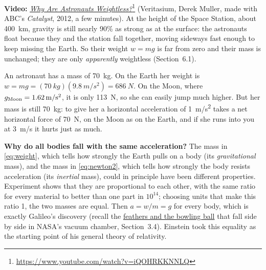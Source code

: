 \documentclass[11pt,a4paper]{article}
\begin{document}
\begin{aside}
\textbf{Video:}
\href{https://www.youtube.com/watch?v=iQOHRKKNNLQ}{\emph{Why Are Astronauts
Weightless?}}\footnote{\url{https://www.youtube.com/watch?v=iQOHRKKNNLQ}} (Veritasium, Derek
Muller, made with ABC's \emph{Catalyst}, 2012, a few minutes). At the height of the Space Station,
about \qty{400}{km}, gravity is still nearly 90\% as strong as at the surface: the astronauts float
because they and the station fall together, moving sideways fast enough to keep missing the Earth.
So their weight $w = mg$ is far from zero and their mass is unchanged; they are only
\emph{apparently} weightless (Section~6.1).
\end{aside}

\begin{example}
An astronaut has a mass of \qty{70}{kg}. On the Earth her weight is $w = mg =
(\qty{70}{kg})(\qty{9.8}{m/s^2}) = \qty{686}{N}$. On the Moon, where $g_{\mathrm{Moon}} =
\qty{1.62}{m/s^2}$, it is only \qty{113}{N}, so she can easily jump much higher. But her mass is
still \qty{70}{kg}: to give her a horizontal acceleration of \qty{1}{m/s^2} takes a net horizontal
force of \qty{70}{N}, on the Moon as on the Earth, and if she runs into you at \qty{3}{m/s} it hurts
just as much.
\end{example}

\begin{aside}
\textbf{Why do all bodies fall with the same acceleration?} The mass in \eqref{eq:weight}, which
tells how strongly the Earth pulls on a body (its \emph{gravitational} mass), and the mass in
\eqref{eq:newton2}, which tells how strongly the body resists acceleration (its \emph{inertial}
mass), could in principle have been different properties. Experiment shows that they are
proportional to each other, with the same ratio for every material to better than one part in
$10^{14}$; choosing units that make this ratio 1, the two masses are equal. Then $a = w/m = g$ for
every body, which is exactly Galileo's discovery (recall the
\href{https://www.youtube.com/watch?v=E43-CfukEgs}{feathers and the bowling ball} that fall side by
side in NASA's vacuum chamber, Section~3.4). Einstein took this equality as the starting point of his general theory of
relativity.
\end{aside}
\end{document}
